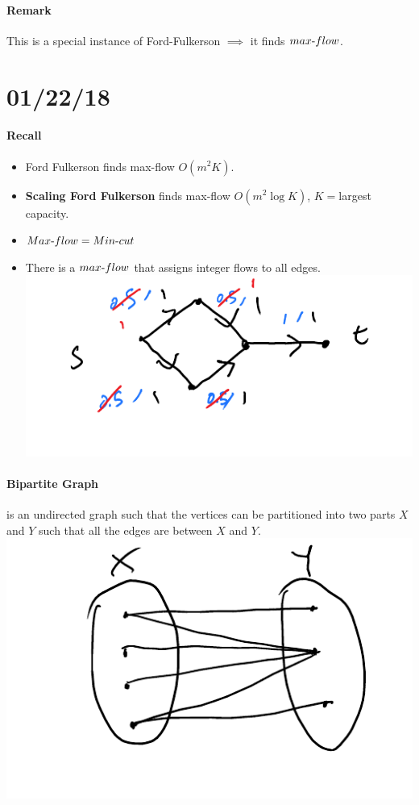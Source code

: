 \documentclass[12 pt]{article}
\begin{document}
        \paragraph{Remark} This is a special instance of
        Ford-Fulkerson $\implies$ it finds $max\hbox{-}flow$.
        \section{01/22/18}
        \paragraph{Recall}
        \begin{itemize}
        \item Ford Fulkerson finds max\hbox{-}flow $O(m^2K)$.
        \item \textbf{Scaling Ford Fulkerson} finds max\hbox{-}flow $O(m^2 \log K)$,
          $K=$largest capacity.
        \item $Max\hbox{-}flow=Min\hbox{-}cut$
        \item There is a $max\hbox{-}flow$ that assigns integer flows
          to all edges.
          \\ \includegraphics[width=.9\textwidth]{i42.pdf}
        \end{itemize}
        \paragraph{Bipartite Graph} is an undirected graph such that
        the vertices can be partitioned into two parts $X$ and $Y$
        such that all the edges are between $X$ and $Y$.
        \\ \includegraphics[width=.9\textwidth]{i43.pdf}
\end{document}
